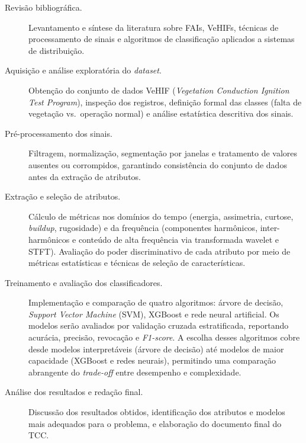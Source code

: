 \begin{description}

\item[Revisão bibliográfica.] Levantamento e síntese da literatura sobre FAIs, VeHIFs, técnicas de processamento de sinais e algoritmos de classificação aplicados a sistemas de distribuição.

\item[Aquisição e análise exploratória do \textit{dataset}.] Obtenção do conjunto de dados VeHIF (\textit{Vegetation Conduction Ignition Test Program}), inspeção dos registros, definição formal das classes (falta de vegetação vs.\ operação normal) e análise estatística descritiva dos sinais.

\item[Pré-processamento dos sinais.] Filtragem, normalização, segmentação por janelas e tratamento de valores ausentes ou corrompidos, garantindo consistência do conjunto de dados antes da extração de atributos.

\item[Extração e seleção de atributos.] Cálculo de métricas nos domínios do tempo (energia, assimetria, curtose, \textit{buildup}, rugosidade) e da frequência (componentes harmônicos, inter-harmônicos e conteúdo de alta frequência via transformada wavelet e STFT). Avaliação do poder discriminativo de cada atributo por meio de métricas estatísticas e técnicas de seleção de características.

\item[Treinamento e avaliação dos classificadores.] Implementação e comparação de quatro algoritmos: árvore de decisão, \textit{Support Vector Machine} (SVM), XGBoost e rede neural artificial. Os modelos serão avaliados por validação cruzada estratificada, reportando acurácia, precisão, revocação e \textit{F1-score}. A escolha desses algoritmos cobre desde modelos interpretáveis (árvore de decisão) até modelos de maior capacidade (XGBoost e redes neurais), permitindo uma comparação abrangente do \textit{trade-off} entre desempenho e complexidade.

\item[Análise dos resultados e redação final.] Discussão dos resultados obtidos, identificação dos atributos e modelos mais adequados para o problema, e elaboração do documento final do TCC.

\end{description}
